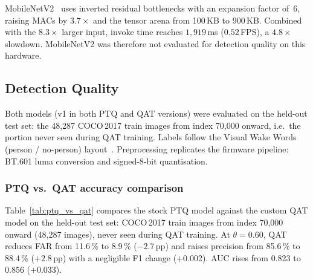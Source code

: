 \documentclass[conference]{IEEEtran}
\begin{document}
MobileNetV2~\cite{mobilenetv2} uses inverted residual bottlenecks
with an expansion factor of~6, raising MACs by $3.7{\times}$ and the
tensor arena from 100\,KB to 900\,KB. Combined with the
$8.3{\times}$ larger input, invoke time reaches $1{,}919$\,ms
($0.52$\,FPS), a $4.8{\times}$ slowdown. MobileNetV2 was therefore
not evaluated for detection quality on this hardware.

\subsection{Detection Quality}
\label{sec:detquality}

Both models (v1 in both PTQ and QAT versions) were evaluated on the held-out test set: the 48{,}287
COCO\,2017 train images from index 70{,}000 onward, i.e.\ the portion
never seen during QAT training. Labels follow the Visual Wake Words
(person / no-person) layout~\cite{vww}. Preprocessing replicates the
firmware pipeline: BT.601 luma conversion and signed-8-bit quantisation.

\subsubsection{PTQ vs.\ QAT accuracy comparison}

Table~\ref{tab:ptq_vs_qat} compares the stock PTQ model against the
custom QAT model on the held-out test set: COCO\,2017 train images
from index 70{,}000 onward (48{,}287 images), never seen during QAT
training. At $\theta\!=\!0.60$, QAT reduces FAR from 11.6\,\% to
8.9\,\% ($-2.7$\,pp) and raises precision from 85.6\,\% to 88.4\,\%
($+2.8$\,pp) with a negligible F1 change (+0.002). AUC rises from
0.823 to 0.856 ($+0.033$).

\begin{table}[h]
\centering
\caption{PTQ vs.\ QAT on 48{,}287 held-out COCO\,2017 images
         ($\theta\!=\!0.60$, images[70000:]).}
\label{tab:ptq_vs_qat}
\end{table}
\end{document}
